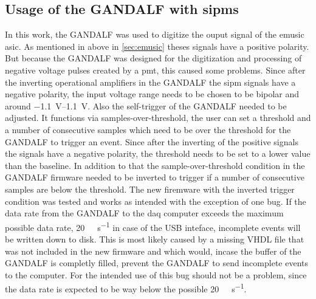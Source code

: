 \subsection{Usage of the GANDALF with \acp{sipm}}
In this work, the GANDALF was used to digitize the ouput signal of the \ac{emusic} \ac{asic}.
As mentioned in above in \autoref{sec:emusic} theses signals have a positive polarity.
But because the GANDALF was designed for the digitization and processing of negative voltage pulses created by a \ac{pmt}, this caused some problems.
Since after the inverting operational amplifiers in the GANDALF the \ac{sipm} signals have a negative polarity, the input voltage range needs to be chosen to be bipolar and around \SIrange{-1.1}{1.1}{\volt}.
Also the self-trigger of the GANDALF needed to be adjusted.
It functions via samples-over-threshold, the user can set a threshold and a number of consecutive samples which need to be over the threshold for the GANDALF to trigger an event.
Since after the inverting of the positive signals the signals have a negative polarity, the threshold needs to be set to a lower \si{\adcu} value than the baseline.
In addition to that the sample-over-threshold condition in the GANDALF firmware needed to be inverted to trigger if a number of consecutive samples are below the threshold.
The new firemware with the inverted trigger condition was tested and works as intended with the exception of one bug.
If the data rate from the GANDALF to the \ac{daq} computer exceeds the maximum possible data rate, \SI{20}{\mega\byte\per\second} in case of the USB inteface, incomplete events will be written down to disk.
This is most likely caused by a missing VHDL file that was not included in the new firmware and which would, incase the buffer of the GANDALF is completly filled, prevent the GANDALF to send incomplete events to the computer.
For the intended use of this bug should not be a problem, since the data rate is expected to be way below the possible \SI{20}{\mega\byte\per\second}.
